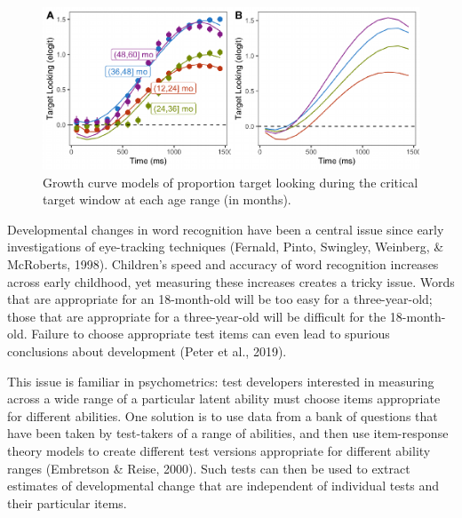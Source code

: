 \documentclass[10pt, letterpaper]{article}
\newenvironment{CodeChunk}{}{}
\begin{document}
\begin{CodeChunk}
\begin{figure}[h]

{\centering \includegraphics{figs/age_gca-1} 

}

\caption[Growth curve models of proportion target looking during the critical target window at each age range (in months)]{Growth curve models of proportion target looking during the critical target window at each age range (in months).}\label{fig:age_gca}
\end{figure}
\end{CodeChunk}

Developmental changes in word recognition have been a central issue
since early investigations of eye-tracking techniques (Fernald, Pinto,
Swingley, Weinberg, \& McRoberts, 1998). Children's speed and accuracy
of word recognition increases across early childhood, yet measuring
these increases creates a tricky issue. Words that are appropriate for
an 18-month-old will be too easy for a three-year-old; those that are
appropriate for a three-year-old will be difficult for the 18-month-old.
Failure to choose appropriate test items can even lead to spurious
conclusions about development (Peter et al., 2019).

This issue is familiar in psychometrics: test developers interested in
measuring across a wide range of a particular latent ability must choose
items appropriate for different abilities. One solution is to use data
from a bank of questions that have been taken by test-takers of a range
of abilities, and then use item-response theory models to create
different test versions appropriate for different ability ranges
(Embretson \& Reise, 2000). Such tests can then be used to extract
estimates of developmental change that are independent of individual
tests and their particular items.
\end{document}

